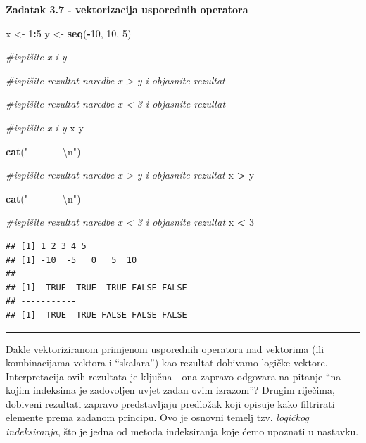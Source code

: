 \documentclass[]{book}
\newenvironment{Shaded}{\begin{snugshade}}{\end{snugshade}}
\newcommand{\KeywordTok}[1]{\textcolor[rgb]{0.13,0.29,0.53}{\textbf{#1}}}
\newcommand{\DecValTok}[1]{\textcolor[rgb]{0.00,0.00,0.81}{#1}}
\newcommand{\CharTok}[1]{\textcolor[rgb]{0.31,0.60,0.02}{#1}}
\newcommand{\StringTok}[1]{\textcolor[rgb]{0.31,0.60,0.02}{#1}}
\newcommand{\CommentTok}[1]{\textcolor[rgb]{0.56,0.35,0.01}{\textit{#1}}}
\newcommand{\OperatorTok}[1]{\textcolor[rgb]{0.81,0.36,0.00}{\textbf{#1}}}
\newcommand{\NormalTok}[1]{#1}
\theoremstyle{definition}
\theoremstyle{definition}
\theoremstyle{definition}
\theoremstyle{remark}
\begin{document}
\textbf{Zadatak 3.7 - vektorizacija usporednih operatora}

\begin{Shaded}
\begin{Highlighting}[]
\NormalTok{x <-}\StringTok{ }\DecValTok{1}\OperatorTok{:}\DecValTok{5}
\NormalTok{y <-}\StringTok{ }\KeywordTok{seq}\NormalTok{(}\OperatorTok{-}\DecValTok{10}\NormalTok{, }\DecValTok{10}\NormalTok{, }\DecValTok{5}\NormalTok{)}

\CommentTok{#ispišite x i y}

\CommentTok{#ispišite rezultat naredbe x > y i objasnite rezultat}

\CommentTok{#ispišite rezultat naredbe x < 3 i objasnite rezultat}
\end{Highlighting}
\end{Shaded}

\begin{Shaded}
\begin{Highlighting}[]
\CommentTok{#ispišite x i y}
\NormalTok{x}
\NormalTok{y}

\KeywordTok{cat}\NormalTok{(}\StringTok{"-----------}\CharTok{\textbackslash{}n}\StringTok{"}\NormalTok{)}


\CommentTok{#ispišite rezultat naredbe x > y i objasnite rezultat}
\NormalTok{x }\OperatorTok{>}\StringTok{ }\NormalTok{y}

\KeywordTok{cat}\NormalTok{(}\StringTok{"-----------}\CharTok{\textbackslash{}n}\StringTok{"}\NormalTok{)}

\CommentTok{#ispišite rezultat naredbe x < 3 i objasnite rezultat}
\NormalTok{x }\OperatorTok{<}\StringTok{ }\DecValTok{3}
\end{Highlighting}
\end{Shaded}

\begin{verbatim}
## [1] 1 2 3 4 5
## [1] -10  -5   0   5  10
## -----------
## [1]  TRUE  TRUE  TRUE FALSE FALSE
## -----------
## [1]  TRUE  TRUE FALSE FALSE FALSE
\end{verbatim}

\begin{center}\rule{0.5\linewidth}{\linethickness}\end{center}

Dakle vektoriziranom primjenom usporednih operatora nad vektorima (ili
kombinacijama vektora i ``skalara'') kao rezultat dobivamo logičke
vektore. Interpretacija ovih rezultata je ključna - ona zapravo odgovara
na pitanje ``na kojim indeksima je zadovoljen uvjet zadan ovim
izrazom''? Drugim riječima, dobiveni rezultati zapravo predstavljaju
predložak koji opisuje kako filtrirati elemente prema zadanom principu.
Ovo je osnovni temelj tzv. \emph{logičkog indeksiranja}, što je jedna od
metoda indeksiranja koje ćemo upoznati u nastavku.
\end{document}
